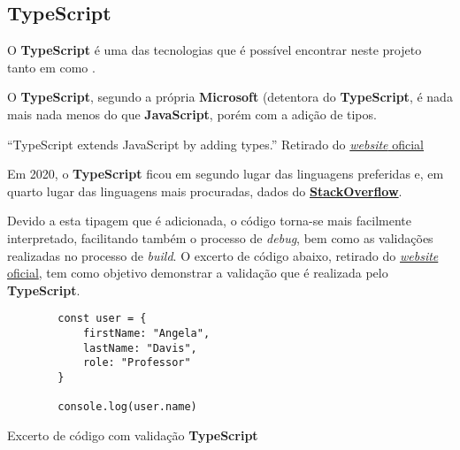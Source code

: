 \subsection{TypeScript}

\begin{minipage}[t]{.3\textwidth}
\end{minipage}
\begin{minipage}[t]{.7\textwidth}
	\minipagerestore

	O \textbf{TypeScript} é uma das tecnologias que é possível encontrar neste projeto tanto em  como .

	O \textbf{TypeScript}, segundo a própria \textbf{Microsoft} (detentora do \textbf{TypeScript}, é nada mais nada menos do que \textbf{JavaScript}, porém com a adição de tipos.

	\begin{quotebox}
		``TypeScript extends JavaScript by adding types.''
		\tcblower
		Retirado do \href{https://www.typescriptlang.org}{\textit{website} oficial}
	\end{quotebox}

\end{minipage}

\vspace{0.2cm}

Em 2020, o \textbf{TypeScript} ficou em segundo lugar das linguagens preferidas e, em quarto lugar das linguagens mais procuradas, dados do \href{https://insights.stackoverflow.com/survey/2020#technology-most-loved-dreaded-and-wanted-languages-loved}{\textbf{StackOverflow}}.

Devido a esta tipagem que é adicionada, o código torna-se mais facilmente interpretado, facilitando também o processo de \textit{debug}, bem como as validações realizadas no processo de \textit{build}. O excerto de código abaixo, retirado do \href{https://www.typescriptlang.org}{\textit{website} oficial}, tem como objetivo demonstrar a validação que é realizada pelo \textbf{TypeScript}.

\begin{longlisting}
	\begin{verbatim}
		const user = {
			firstName: "Angela",
			lastName: "Davis",
			role: "Professor"
		}

		console.log(user.name)
	\end{verbatim}

	\caption{Excerto de código com validação \textbf{TypeScript}}
\end{longlisting}

